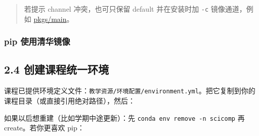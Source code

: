 \begin{quote}
若提示 channel 冲突，也可只保留 default 并在安装时加 \texttt{-c}
镜像通道，例如
\href{https://mirrors.tuna.tsinghua.edu.cn/anaconda/pkgs/main/}{pkgs/main}。
\end{quote}

\subsubsection{pip
使用清华镜像}\label{pip-ux4f7fux7528ux6e05ux534eux955cux50cf}

\begin{Shaded}
\begin{Highlighting}[]
\OperatorTok{{-}}\OperatorTok{://}\OperatorTok{/}
\OperatorTok{{-}}
\end{Highlighting}
\end{Shaded}

\subsection{2.4
创建课程统一环境}\label{ux521bux5efaux8bfeux7a0bux7edfux4e00ux73afux5883}

课程已提供环境定义文件：\texttt{教学资源/环境配置/environment.yml}。把它复制到你的课程目录（或直接引用绝对路径），然后：

\begin{Shaded}
\begin{Highlighting}[]
\OperatorTok{:}
\OperatorTok{{-}}
\end{Highlighting}
\end{Shaded}

如果以后想重建（比如学期中途更新）：先
\texttt{conda\ env\ remove\ -n\ scicomp} 再 create。若你更喜欢 pip：

